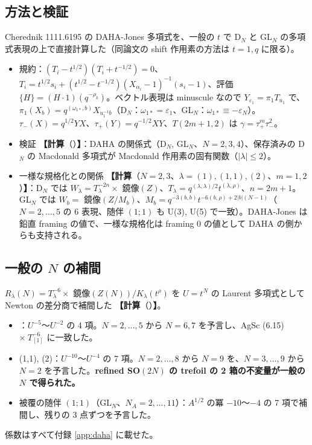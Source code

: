 \documentclass[a4paper,10pt]{ltjsarticle}
\newcommand{\comp}[1]{\textbf{【計算}\if\relax\detokenize{#1}\relax\else（#1）\fi\textbf{】}}
\begin{document}
\subsection{方法と検証}
Cherednik 1111.6195 の DAHA-Jones 多項式を、一般の $t$ で D$_N$ と GL$_N$ の多項式表現の上で直接計算した（同論文の shift 作用素の方法は $t = 1, q$ に限る）。
\begin{itemize}
\item 規約：$(T_i - t^{1/2})(T_i + t^{-1/2}) = 0$、$T_i = t^{1/2} s_i + (t^{1/2} - t^{-1/2})(X_{\alpha_i} - 1)^{-1}(s_i - 1)$、評価 $\{H\} = (H \cdot 1)(q^{-\rho_k})$。ベクトル表現は minuscule なので $Y_{\varepsilon_1} = \pi_1 T_{u_1}$ で、$\pi_1(X_b) = q^{(\omega_{1*}, b)} X_{u_1^{-1} b}$（D$_N$：$\omega_{1*} = \varepsilon_1$、GL$_N$：$\omega_{1*} \equiv -\varepsilon_N$）。$\tau_-(X) = q^{1/2} Y X$、$\tau_+(Y) = q^{-1/2} X Y$、$T(2m+1, 2)$ は $\gamma = \tau_+^m \tau_-^2$。
\item 検証 \comp{}：DAHA の関係式（D$_N$, GL$_N$、$N = 2, 3, 4$）、保存済みの D$_N$ の Macdonald 多項式が Macdonald 作用素の固有関数（$|\lambda| \le 2$）。
\item 一様な規格化との関係 \comp{$N = 2, 3$、$\lambda = (1), (1,1), (2)$、$m = 1, 2$}：D$_N$ では $W_\lambda = T_\lambda^{-2n} \times$ 鏡像$(Z)$、$T_\lambda = q^{(\lambda,\lambda)/2} t^{(\lambda,\rho)}$、$n = 2m + 1$。GL$_N$ では $W_b = $ 鏡像$(Z/M_b)$、$M_b = q^{-3(b,b)} t^{-6(b,\rho) + 2|b|(N-1)}$（$N = 2, \dots, 5$ の 6 表現、随伴 $(1;1)$ も U(3), U(5) で一致）。DAHA-Jones は鉛直 framing の値で、一様な規格化は framing 0 の値として DAHA の側からも支持される。
\end{itemize}

\subsection{一般の $N$ の補間}
$R_\lambda(N) = T_\lambda^{-6} \times$ 鏡像$(Z(N)) / K_\lambda(t^\rho)$ を $U = t^N$ の Laurent 多項式として Newton の差分商で補間した \comp{}。
\begin{itemize}
\item [1]：$U^{-5}$〜$U^{-2}$ の 4 項。$N = 2, \dots, 5$ から $N = 6, 7$ を予言し、AgSc (6.15) $\times\ T_{[1]}^{-6}$ に一致した。
\item (1,1), (2)：$U^{-10}$〜$U^{-4}$ の 7 項。$N = 2, \dots, 8$ から $N = 9$ を、$N = 3, \dots, 9$ から $N = 2$ を予言した。\textbf{refined SO$(2N)$ の trefoil の 2 箱の不変量が一般の $N$ で得られた。}
\item 被覆の随伴 $(1;1)$（GL$_N$、$N_A = 2, \dots, 11$）：$A^{1/2}$ の冪 $-10$〜$-4$ の 7 項で補間し、残りの 3 点ずつを予言した。
\end{itemize}
係数はすべて付録 \ref{app:daha} に載せた。
\end{document}

